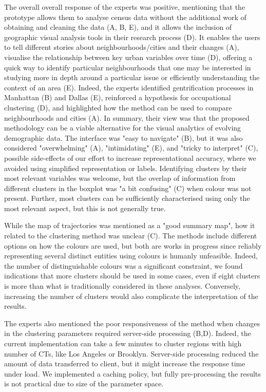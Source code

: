 The overall overall response of the experts was positive,  mentioning that the
prototype allows them to analyse census data without the additional work of
obtaining and cleaning the data (A, B, E), and it allows the inclusion of
geographic visual analysis tools in their research process (D). It enables the
users to tell different stories about neighbourhoods/cities and their changes
(A), visualise the relationship between key urban variables over time (D),
offering a quick way to identify particular neighbourhoods that one may be
interested in studying more in depth around a particular issue or efficiently
understanding the context of an area (E).  Indeed, the experts identified
gentrification processes in Manhattan (B) and Dallas (E), reinforced a
hypothesis for occupational clustering (D), and highlighted how the method can
be used to compare neighbourhoods and cities (A). In summary, their view was
that the proposed methodology can be a viable alternative for the visual
analytics of evolving demographic data. The interface was "easy to navigate"
(B), but it was also considered "overwhelming" (A), "intimidating" (E), and
"tricky to interpret" (C), possible side-effects of our effort to increase
representational accuracy, where we avoided using simplified representation or
labels. Identifying clusters by their most relevant variables was welcome, but
the overlap of information from different clusters in the boxplot was "a bit
confusing" (C) when colour was not present. Further, most clusters can be
sufficiently characterised using only the most relevant aspect, but this is not
generally true. 


While the map of trajectories was mentioned as a "good summary map", how it
related to the clustering method was unclear (C). The methods include different
options on how the colours are used, but both are works in progress since reliably
representing several distinct entities using colours is humanly unfeasible.
Indeed, the number of distinguishable colours was a significant constraint, we
found indications that more clusters should be used in some cases, even if eight
clusters is more than what is traditionally considered in these analyses.
Conversely, increasing the number of clusters would also complicate the
interpretation of the results.


The experts also mentioned the poor responsiveness of the method when changes in
the clustering parameters required server-side processing (B,D). Indeed, the
current implementation can take a few minutes to cluster regions with high
number of CTs, like Los Angeles or Brooklyn. Server-side processing reduced the
amount of data transferred to client, but it might increase the response time
under load. We implemented a caching policy, but fully pre-processing the
results is not practical due to size of the parameter space.

